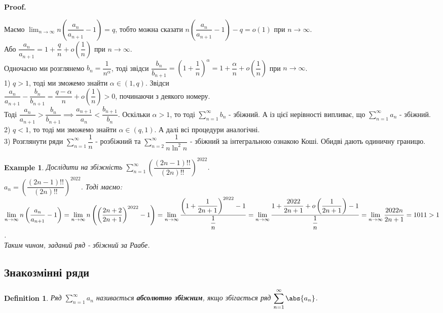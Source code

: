 \documentclass[a4paper, 10pt]{article}
\makeatletter
\def\huge{\displaystyle}
\def\qed{$\blacksquare$}
\theoremstyle{theoremdd}
\theoremstyle{theoremdd}
\theoremstyle{theoremdd}
\newtheorem{definition}[theorem]{Definition}
\theoremstyle{theoremdd}
\theoremstyle{theoremdd}
\newtheorem{example}[theorem]{Example}
\theoremstyle{theoremdd}
\theoremstyle{theoremdd}
\theoremstyle{theoremdd}
\theoremstyle{theoremdd}
\renewenvironment{proof}[1][Proof.\\]{\par
\pushQED{\hfill \qed}%
\normalfont \topsep6\p@\@plus6\p@\relax
\trivlist
\item\relax
{\bfseries
#1\@addpunct{.}}\hspace\labelsep\ignorespaces
}{%
\popQED\endtrivlist\@endpefalse
}
\makeatother
\begin{document}
\begin{proof}
Маємо $\huge\lim_{n \to \infty} n \left( \dfrac{a_n}{a_{n+1}} - 1 \right) = q$, тобто можна сказати $n \left( \dfrac{a_n}{a_{n+1}} - 1 \right) - q = o(1)$ при $n \to \infty$.\\
Або $\dfrac{a_n}{a_{n+1}} = 1 + \dfrac{q}{n} + o\left( \dfrac{1}{n} \right)$ при $n \to \infty$.\\
Одночасно ми розглянемо $b_n = \dfrac{1}{n^\alpha}$, тоді звідси $\dfrac{b_n}{b_{n+1}} = \left( 1 + \dfrac{1}{n} \right)^\alpha = 1 + \dfrac{\alpha}{n} + o\left( \dfrac{1}{n} \right)$ при $n \to \infty$.
\bigskip \\
1) $q > 1$, тоді ми зможемо знайти $\alpha \in (1,q)$. Звідси\\
$\dfrac{a_n}{a_{n+1}} - \dfrac{b_n}{b_{n+1}} = \dfrac{q-\alpha}{n} + o \left( \dfrac{1}{n} \right) > 0$, починаючи з деякого номеру.\\
Тоді $\dfrac{a_n}{a_{n+1}} > \dfrac{b_n}{b_{n+1}} \implies \dfrac{a_{n+1}}{a_n} < \dfrac{b_{n+1}}{b_n}$. Оскільки $\alpha > 1$, то тоді $\huge\sum_{n=1}^\infty b_n$ - збіжний. А із цієї нерівності випливає, що $\huge\sum_{n=1}^\infty a_n$ - збіжний.
\bigskip \\
2) $q < 1$, то тоді ми зможемо знайти $\alpha \in (q,1)$. А далі всі процедури аналогічні.
\bigskip \\
3) Розглянути ряди $\huge\sum_{n=1}^\infty \dfrac{1}{n}$ - розбіжний та $\huge\sum_{n=2}^\infty \dfrac{1}{n \ln^2 n}$ - збіжний за інтегральною ознакою Коші. Обидві дають одиничну границю.
\end{proof}

\begin{example}
Дослідити на збіжність $\huge\sum_{n=1}^\infty \left(\dfrac{(2n-1)!!}{(2n)!!} \right)^{2022}$.\\
$a_n = \left(\dfrac{(2n-1)!!}{(2n)!!}\right)^{2022}$. Тоді маємо:\\
$\huge\lim_{n \to \infty} n \left( \dfrac{a_n}{a_{n+1}} - 1 \right) = \lim_{n \to \infty} n \left( \left( \dfrac{2n+2}{2n+1} \right)^{2022} -1 \right) = \lim_{n \to \infty} \dfrac{\left( 1 + \dfrac{1}{2n+1} \right)^{2022} - 1}{\dfrac{1}{n}} = \lim_{n \to \infty} \dfrac{1 + \dfrac{2022}{2n+1} + o\left( \dfrac{1}{2n+1} \right) - 1}{\dfrac{1}{n}} \\
= \lim_{n \to \infty} \dfrac{2022n}{2n+1} = 1011 > 1$.\\
Таким чином, заданий ряд - збіжний за Раабе.
\end{example}

\subsection{Знакозмінні ряди}
\begin{definition}
Ряд $\huge \sum_{n=1}^\infty a_n$ називається \textbf{абсолютно збіжним}, якщо збігається ряд $\huge \sum_{n=1}^\infty \abs{a_n}$.
\end{definition}
\end{document}
